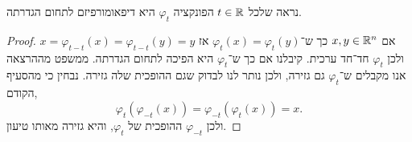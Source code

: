 \subquestion{}
נראה שלכל $t \in \mathbb{R}$ הפונקציה $\varphi_t$ היא דיפאומורפיזם לתחום הגדרתה.
\begin{proof}
	אם $x, y \in \mathbb{R}^n$ כך ש־$\varphi_t(x) = \varphi_t(y)$ אז $x = \varphi_{t - t}(x) = \varphi_{t - t}(y) = y$ ולכן $\varphi_t$ חד־חד ערכית.
	קיבלנו אם כך ש־$\varphi_t$ היא הפיכה לתחום הגדרתה.
	ממשפט מההרצאה אנו מקבלים ש־$\varphi_t$ גם גזירה, ולכן נותר לנו לבדוק שגם ההופכית שלה גזירה.
	נבחין כי מהסעיף הקודם,
	\[
		\varphi_t(\varphi_{-t}(x))
		= \varphi_{-t}(\varphi_t(x))
		= x
	.\]
	ולכן $\varphi_{-t}$ ההופכית של $\varphi_t$, והיא גזירה מאותו טיעון.
\end{proof}


